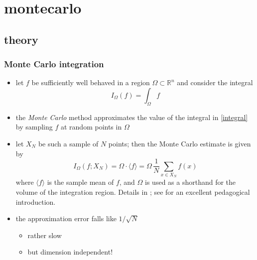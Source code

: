 %
%


\section{montecarlo}
\subsection{theory}

\begin{frame}
%
  \frametitle{Monte Carlo integration}
%
  \begin{itemize}
%
  \item let $f$ be sufficiently well behaved in a region $\Omega \subset \mathbb{R}^{n}$ and
    consider the integral
    \begin{equation}
      I_{\Omega} (f) = \int_{\Omega} f
      \label{eq:integral}
    \end{equation}
%
  \item the {\em Monte Carlo} method approximates the value of the integral in \eqref{integral}
    by sampling $f$ at random points in $\Omega$
%
  \item let $X_{N}$ be such a sample of $N$ points; then the Monte Carlo estimate is given by
    \begin{equation}
      I_{\Omega} (f; X_{N})
      =
      \Omega \cdot \langle f \rangle
      =
      \Omega \, \frac{1}{N} \sum_{x \in X_{N}} f(x)
      \label{eq:mc-estimate}
    \end{equation}
%
    where $\langle f \rangle$ is the sample mean of $f$, and $\Omega$ is used as a shorthand
    for the volume of the integration region. Details in \citep{hammersley,ueberhuber}; see
    \cite{weinzierl} for an excellent pedagogical introduction.
%
  \item the approximation error falls like $1/\sqrt{N}$
    \begin{itemize}
    \item rather slow
    \item but dimension independent!
    \end{itemize}
  \end{itemize}
%
\end{frame}

